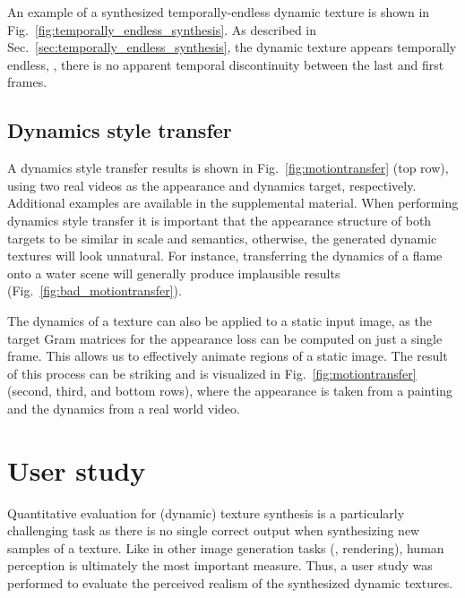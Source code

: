 An example of a synthesized temporally-endless dynamic texture is shown in
Fig.\ \ref{fig:temporally_endless_synthesis}. As described in Sec.\ 
\ref{sec:temporally_endless_synthesis}, the dynamic texture appears
temporally endless, \ie, there is no apparent temporal discontinuity between the last and first frames.



\subsection{Dynamics style transfer}

A dynamics style transfer results is shown in Fig.\ 
\ref{fig:motiontransfer} (top row), using two real videos as the appearance and dynamics target, respectively.
Additional examples are available in the supplemental material.
When performing dynamics style transfer it is important
that the appearance structure of both targets to be similar in scale and semantics,
otherwise, the generated dynamic textures will look unnatural.
For instance, transferring the dynamics of a flame onto a water 
scene will generally produce implausible results (Fig.\ \ref{fig:bad_motiontransfer}).



The dynamics of a texture can also be applied to a static input image,
as the target Gram matrices for the appearance loss can be computed
on just a single frame.
This allows us to effectively animate regions of a static image.
The result of this process can be striking and is visualized in
Fig.\ \ref{fig:motiontransfer} (second, third, and bottom rows), where the appearance is 
taken from a painting and the dynamics from a real world video.

\clearpage

\clearpage

\section{User study}\label{sec:user_study}

Quantitative evaluation for (dynamic) texture synthesis is a particularly
challenging task as there is no single correct output when 
synthesizing new samples of a texture.
Like in other image generation tasks (\eg, rendering), 
human perception is ultimately the most important measure.
Thus, a user study was performed to evaluate the perceived 
realism of the synthesized dynamic textures.

